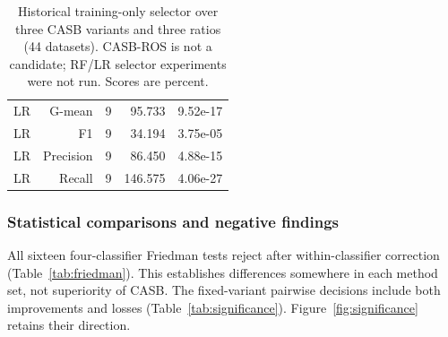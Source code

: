\documentclass[conference]{IEEEtran}
\begin{document}
\begin{table}[!tp]
\begin{minipage}[t]{.48\textwidth}
{\begin{tabular}{lrrrr}
LR & G-mean & 9 & 95.733 & 9.52e-17 \\
LR & F1 & 9 & 34.194 & 3.75e-05 \\
LR & Precision & 9 & 86.450 & 4.88e-15 \\
LR & Recall & 9 & 146.575 & 4.06e-27 \\
\bottomrule\end{tabular}}\end{minipage}\hfill
\begin{minipage}[t]{.48\textwidth}\vspace{0pt}\centering\footnotesize
\caption{Fixed-variant Wilcoxon-Holm decisions, including no resampling and compatible legacy controls. Counts span all four metrics.}\label{tab:significance}
\par\vspace{14pt}\centering\footnotesize
\caption{Historical training-only selector over three CASB variants and three ratios (44 datasets). CASB-ROS is not a candidate; RF/LR selector experiments were not run. Scores are percent.}\label{tab:selector}
\end{minipage}

\end{table}

\subsubsection{Statistical comparisons and negative findings}
All sixteen four-classifier Friedman tests reject after within-classifier correction (Table~\ref{tab:friedman}). This establishes differences somewhere in each method set, not superiority of CASB. The fixed-variant pairwise decisions include both improvements and losses (Table~\ref{tab:significance}). Figure~\ref{fig:significance} retains their direction.
\end{document}
